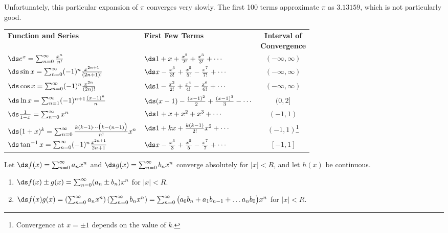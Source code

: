 Unfortunately, this particular expansion of $\pi$ converges very slowly. The first 
100 terms approximate $\pi$ as $3.13159$, which is not particularly good.
\pagebreak

\enlargethispage{4\baselineskip}
\setboxwidth{120pt}
\noindent\hskip-110pt
\begin{minipage}{1.3\linewidth}
{%
\noindent\begin{tabular}{llc}
\textbf{Function and Series} & \textbf{First Few Terms} & \parbox{50pt}{\centering\textbf{Interval of}\\\textbf{Convergence}} \\
\rule{0pt}{25pt}$\ds e^x = \sum_{n=0}^\infty \frac{x^n}{n!}$ & $\ds 1+ x+\frac{x^2}{2!} + \frac{x^3}{3!}+\cdots$ & $(-\infty,\infty)$\\
\rule{0pt}{25pt}$\ds \sin x = \sum_{n=0}^\infty (-1)^n\frac{x^{2n+1}}{(2n+1)!}$ & $\ds x-\frac{x^3}{3!}+\frac{x^5}{5!} - \frac{x^7}{7!}+\cdots$ & $(-\infty,\infty)$\\
\rule{0pt}{25pt}$\ds \cos x = \sum_{n=0}^\infty (-1)^n\frac{x^{2n}}{(2n)!}$ & $\ds 1-\frac{x^2}{2!}+\frac{x^4}{4!} - \frac{x^6}{6!} +\cdots$ & $(-\infty,\infty)$\\
\rule{0pt}{25pt}$\ds \ln x = \sum_{n=1}^\infty(-1)^{n+1}\frac{(x-1)^n}{n}$ & $\ds (x-1)- \frac{(x-1)^2}{2} +\frac{(x-1)^3}{3}-\cdots$& $(0,2]$\\
\rule{0pt}{25pt}$\ds \frac{1}{1-x} = \sum_{n=0}^\infty x^n$ &$\ds 1+x+x^2+x^3+\cdots$& $(-1,1)$\\
\rule{0pt}{25pt}\small$\ds (1+x)^k=\sum_{n=0}^\infty \frac{k(k-1)\cdots\big(k-(n-1)\big)}{n!}x^n$ \normalsize& $\ds 1+kx+\frac{k(k-1)}{2!}x^2 + \cdots$ & $(-1,1)$\footnote{Convergence at $x=\pm1$ depends on the value of $k$.}\\
\rule{0pt}{25pt}$\ds \tan^{-1}x = \sum_{n=0}^\infty (-1)^n\frac{x^{2n+1}}{2n+1}$ & $\ds x-\frac{x^3}{3}+\frac{x^5}{5}-\frac{x^7}{7}+\cdots$ & $[-1,1]$
\end{tabular}
}

\baselineskip

{Let $\ds f(x) = \sum_{n=0}^\infty a_nx^n$ and $\ds g(x) = \sum_{n=0}^\infty b_nx^n$ converge absolutely for $|x|<R$, and let $h(x)$ be continuous.
\begin{enumerate}
	\item $\ds f(x)\pm g(x) = \sum_{n=0}^\infty (a_n\pm b_n)x^n$ \quad for $|x|<R$.
	\item	$\ds 	f(x)g(x) = \left(\sum_{n=0}^\infty a_nx^n\right)\left(\sum_{n=0}^\infty b_nx^n\right) = \sum_{n=0}^\infty\big(a_0b_n+a_1b_{n-1}+\ldots a_nb_0\big)x^n
		$ for $|x|<R$.
	

\end{enumerate}}
\end{minipage}
